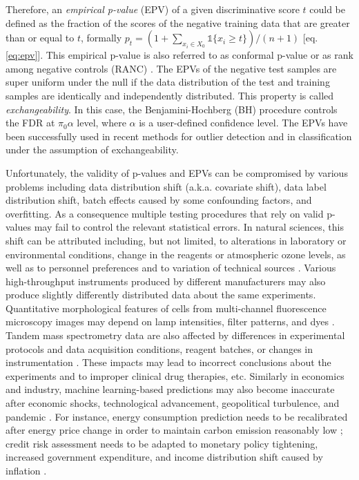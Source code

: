 \documentclass[10pt,letterpaper]{article}
\newcommand{\mathone}{\mathds{1}}
\begin{document}
 
Therefore, an {\em empirical p-value} (EPV) of a given discriminative score $t$ could be defined as the fraction of the scores of the negative training data that are greater than or equal to $t$, formally $p_t=(1+\sum_{x_i\in X_0} \mathone\{x_i \ge t\})/(n+1) \label{eq:epv}$ [eq. \ref{eq:epv}].
This empirical p-value is also referred to as conformal p-value \cite{bates2023testing} or as rank among negative controls (RANC) \cite{gao2023simultaneous}.
The EPVs of the negative test samples are super uniform under the null if the data distribution of the test and training samples are identically and independently distributed.
This property is called {\em exchangeability}.
In this case, the Benjamini-Hochberg (BH) procedure controls the FDR at $\pi_0\alpha$ level, where $\alpha$ is a user-defined confidence level.
The EPVs have been successfully used in recent methods for outlier detection \cite{bates2023testing,marandon2023adaptive} and in classification \cite{rava2021burden, angelopoulos2021learn} under the assumption of exchangeability. %

Unfortunately, the validity of p-values and EPVs can be compromised by various problems including  data distribution shift (a.k.a. covariate shift), data label distribution shift, batch effects \cite{Candela2009DatasetShift} caused by some confounding factors, and overfitting.
As a consequence multiple testing procedures that rely on valid p-values may fail to control the relevant statistical errors.
In natural sciences, this shift can be attributed including, but not limited, to alterations in laboratory or environmental conditions, change in the reagents or atmospheric ozone levels, as well as to personnel preferences and to variation of technical sources \cite{leek2010tackling}.
Various high-throughput instruments produced by different manufacturers may also produce slightly differently distributed data about the same experiments.
Quantitative morphological features of cells from multi-channel fluorescence microscopy images may depend on lamp intensities, filter patterns, and dyes \cite{bray2016cell}.
Tandem mass spectrometry data are also affected by differences in experimental protocols and data acquisition conditions, reagent batches, or changes in instrumentation \cite{phua2022perspectives, vcuklina2021diagnostics}.
These impacts may lead to incorrect conclusions about the experiments and to improper clinical drug therapies, etc.
Similarly in economics and industry, machine learning-based predictions may also become inaccurate after economic shocks, technological advancement, geopolitical turbulence, and pandemic \cite{ramey2016macroeconomic}.
For instance, energy consumption prediction needs to be recalibrated after energy price change in order to maintain carbon emission reasonably low \cite{clement2023coping}; credit risk assessment needs to be adapted to monetary policy tightening, increased government expenditure, and income distribution shift caused by inflation \cite{kritzman2012regime,guo2023predict, Zhang:EECS-2021-262}.
\end{document}
